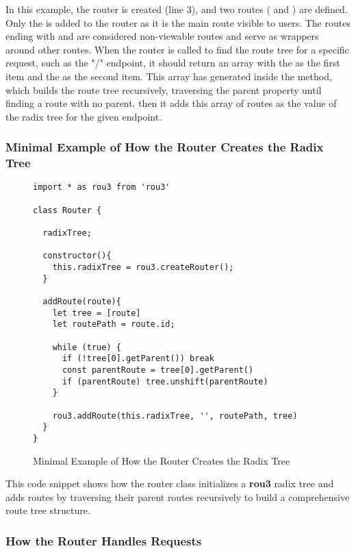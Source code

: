 In this example, the router is created (line 3), and two routes ( and ) are defined. Only the  is added to the router as it is the main route visible to users. The routes ending with  and  are considered non-viewable routes and serve as wrappers around other routes. When the router is called to find the route tree for a specific request, such as the "/" endpoint, it should return an array with the  as the first item and the  as the second item. This array has generated inside the  method, which builds the route tree recursively, traversing the parent property until finding a route with no parent. then it adds this array of routes as the value of the radix tree for the given endpoint.

\pagebreak

\subsubsection*{Minimal Example of How the Router Creates the Radix Tree}
\begin{figure}[h!]
\begin{verbatim}
import * as rou3 from 'rou3'

class Router {

  radixTree;

  constructor(){
    this.radixTree = rou3.createRouter();
  }

  addRoute(route){
    let tree = [route]
    let routePath = route.id;

    while (true) {
      if (!tree[0].getParent()) break
      const parentRoute = tree[0].getParent()
      if (parentRoute) tree.unshift(parentRoute)
    }

    rou3.addRoute(this.radixTree, '', routePath, tree)
  }
}
\end{verbatim}
\caption{Minimal Example of How the Router Creates the Radix Tree}
\end{figure}

This code snippet shows how the router class initializes a \textbf{rou3} radix tree and adds routes by traversing their parent routes recursively to build a comprehensive route tree structure.





\subsubsection{How the Router Handles Requests}

